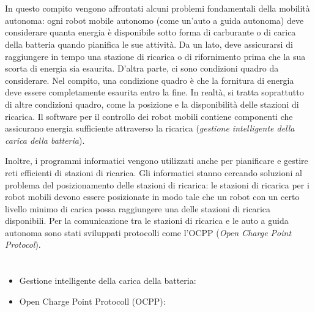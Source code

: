 {{%
\section*{\BrochureItsInformatics}
In questo compito vengono affrontati alcuni problemi fondamentali della mobilità autonoma: ogni robot mobile autonomo (come un’auto a guida autonoma) deve considerare quanta energia è disponibile sotto forma di carburante o di carica della batteria quando pianifica le sue attività. Da un lato, deve assicurarsi di raggiungere in tempo una stazione di ricarica o di rifornimento prima che la sua scorta di energia sia esaurita. D’altra parte, ci sono condizioni quadro da considerare. Nel compito, una condizione quadro è che la fornitura di energia deve essere completamente esaurita entro la fine. In realtà, si tratta soprattutto di altre condizioni quadro, come la posizione e la disponibilità delle stazioni di ricarica. Il software per il controllo dei robot mobili contiene componenti che assicurano energia sufficiente attraverso la ricarica (\emph{gestione intelligente della carica della batteria}).

Inoltre, i programmi informatici vengono utilizzati anche per pianificare e gestire reti efficienti di stazioni di ricarica. Gli informatici stanno cercando soluzioni al problema del posizionamento delle stazioni di ricarica: le stazioni di ricarica per i robot mobili devono essere posizionate in modo tale che un robot con un certo livello minimo di carica possa raggiungere una delle stazioni di ricarica disponibili. Per la comunicazione tra le stazioni di ricarica e le auto a guida autonoma sono stati sviluppati protocolli come l’OCPP (\emph{Open Charge Point Protocol}).



\section*{\BrochureWebsitesAndKeywords}
{\raggedright
\begin{itemize}
  \item Gestione intelligente della carica della batteria: \href{https://www.researchgate.net/publication/364734487_Intelligent_Battery_Recharge_Management_for_Mobile_Robots}{}
  \item Open Charge Point Protocoll (OCPP): \href{https://de.wikipedia.org/wiki/OCPP}{}
\end{itemize}


}}}
